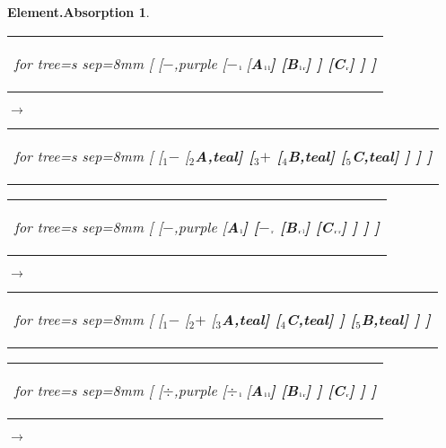 \documentclass[UTF8,10pt]{ctexart}
\newcommand{\Bigskip}{\bigskip\medskip}
\newcommand{\subtreeA}{\bf A}
\newcommand{\subtreeB}{\bf B}
\newcommand{\subtreeC}{\bf C}
\newcommand{\I}{$_{\scriptscriptstyle 1}$}
\newcommand{\II}{$_{\scriptscriptstyle 2}$}
\newcommand{\III}{$_{\scriptscriptstyle 3}$}
\newcommand{\IV}{$_{\scriptscriptstyle 4}$}
\newcommand{\V}{$_{\scriptscriptstyle 5}$}
\newcommand{\lc}{$_{\:\!\scriptscriptstyle\rm l\!}$}
\newcommand{\rc}{$_{\:\!\scriptscriptstyle\rm r\!}$}
\newcommand{\Addition}{$+$}
\newcommand{\Subtraction}{$-$}
\newcommand{\Division}{$\div$}
\newtheorem*{Element.Absorption}{\bf Element.Absorption }
\begin{document}
	\begin{center}\vspace*{\fill}
		\begin{Element.Absorption}
			\qquad\par\Bigskip
			\begin{tabular}{c}
				\begin{forest}
					for tree={s sep=8mm}
					[
						[\Subtraction,purple
							[\Subtraction\lc
								[\subtreeA\lc\lc]
								[\subtreeB\lc\rc]
							]
							[\subtreeC\rc]
						]
					]
				\end{forest}
			\end{tabular}
			\qquad
			$\longrightarrow$
			\qquad
			\begin{tabular}{c}
				\begin{forest}
					for tree={s sep=8mm}
					[
						[\I\Subtraction
							[\II\subtreeA,teal]
							[\III\Addition
								[\IV\subtreeB,teal]
								[\V\subtreeC,teal]
							]
						]
					]
				\end{forest}
			\end{tabular}
			\par\bigskip
			\begin{tabular}{c}
				\begin{forest}
					for tree={s sep=8mm}
					[
						[\Subtraction,purple
							[\subtreeA\lc]
							[\Subtraction\rc
								[\subtreeB\rc\lc]
								[\subtreeC\rc\rc]
							]
						]
					]
				\end{forest}
			\end{tabular}
			\qquad
			$\longrightarrow$
			\qquad
			\begin{tabular}{c}
				\begin{forest}
					for tree={s sep=8mm}
					[
						[\I\Subtraction
							[\II\Addition
								[\III\subtreeA,teal]
								[\IV\subtreeC,teal]
							]
							[\V\subtreeB,teal]
						]
					]
				\end{forest}
			\end{tabular}
			\par\bigskip
			\begin{tabular}{c}
				\begin{forest}
					for tree={s sep=8mm}
					[
						[\Division,purple
							[\Division\lc
								[\subtreeA\lc\lc]
								[\subtreeB\lc\rc]
							]
							[\subtreeC\rc]
						]
					]
				\end{forest}
			\end{tabular}
			\qquad
			$\longrightarrow$
			\qquad
			\begin{tabular}{c}

\end{tabular}
\end{Element.Absorption}
\end{center}
\end{document}
